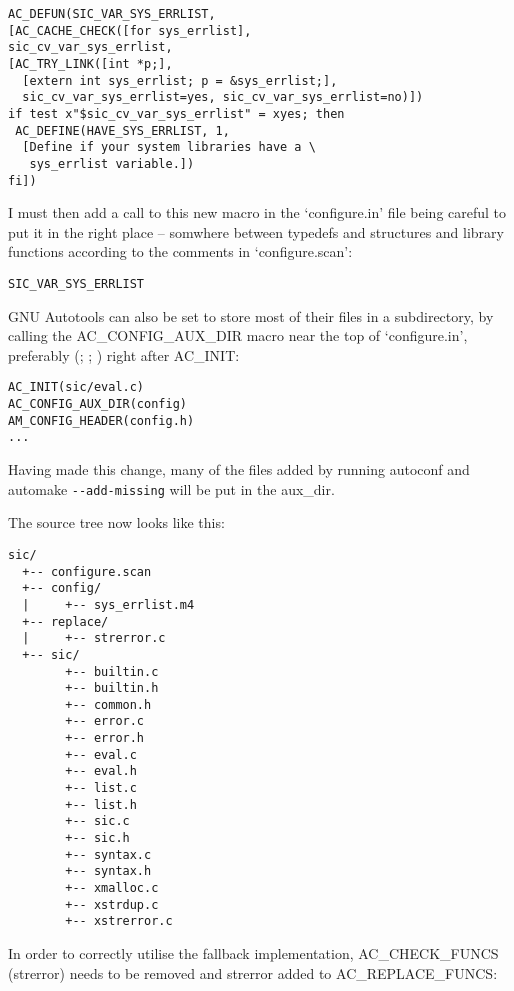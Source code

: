 \begin{Verbatim}[frame=single]
AC_DEFUN(SIC_VAR_SYS_ERRLIST,
[AC_CACHE_CHECK([for sys_errlist],
sic_cv_var_sys_errlist,
[AC_TRY_LINK([int *p;],
  [extern int sys_errlist; p = &sys_errlist;],
  sic_cv_var_sys_errlist=yes, sic_cv_var_sys_errlist=no)])
if test x"$sic_cv_var_sys_errlist" = xyes; then
 AC_DEFINE(HAVE_SYS_ERRLIST, 1,
  [Define if your system libraries have a \
   sys_errlist variable.])
fi])
\end{Verbatim}

I must then add a call to this new macro in the `configure.in' file being careful to put it in the right place -- somwhere between typedefs and structures and library functions according to the comments in `configure.scan': 

\begin{Verbatim}[frame=single]
SIC_VAR_SYS_ERRLIST
\end{Verbatim}

GNU Autotools can also be set to store most of their files in a subdirectory,
by calling the AC\_{}CONFIG\_{}AUX\_{}DIR macro near the top 
of `configure.in', preferably ({\MbQ{}}; {\MbQ{}}; {\MeQ{}}) right after AC\_{}INIT: 

\begin{Verbatim}[frame=single]
AC_INIT(sic/eval.c)
AC_CONFIG_AUX_DIR(config)
AM_CONFIG_HEADER(config.h)
...
\end{Verbatim}

Having made this change, many of the files added by running autoconf and 
automake \verb+--add-missing+ will be put in the aux\_{}dir. 

The source tree now looks like this: 

\begin{Verbatim}[frame=single]
sic/
  +-- configure.scan
  +-- config/
  |     +-- sys_errlist.m4
  +-- replace/
  |     +-- strerror.c
  +-- sic/
        +-- builtin.c
        +-- builtin.h
        +-- common.h
        +-- error.c
        +-- error.h
        +-- eval.c
        +-- eval.h
        +-- list.c
        +-- list.h
        +-- sic.c
        +-- sic.h
        +-- syntax.c
        +-- syntax.h
        +-- xmalloc.c
        +-- xstrdup.c
        +-- xstrerror.c
\end{Verbatim}

In order to correctly utilise the fallback implementation,
AC\_{}CHECK\_{}FUNCS (strerror) needs to be removed and strerror added 
to AC\_{}REPLACE\_{}FUNCS: 

